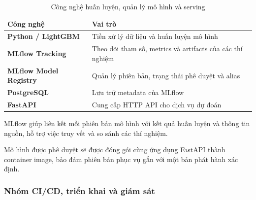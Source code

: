 \begin{table}[!htbp]\centering
\fontsize{12}{15}\selectfont{}
\setlength{\tabcolsep}{4pt}\setlength{\arrayrulewidth}{0.4pt}\renewcommand{\arraystretch}{1.2}
\setlength{\ReportTableWidth}{\dimexpr\linewidth-3\arrayrulewidth\relax}
\begin{tabular}{|L{\tabcolsep\relax}|L{\tabcolsep\relax}|}
\hline
\textbf{Công nghệ} & \textbf{Vai trò} \\
\hline
\textbf{Python / LightGBM} & Tiền xử lý dữ liệu và huấn luyện mô hình \\\hline
\textbf{MLflow Tracking} & Theo dõi tham số, metrics và artifacts của các thí nghiệm \\\hline
\textbf{MLflow Model Registry} & Quản lý phiên bản, trạng thái phê duyệt và alias  \\\hline
\textbf{PostgreSQL} & Lưu trữ metadata của MLflow \\\hline
\textbf{FastAPI} & Cung cấp HTTP API cho dịch vụ dự đoán \\\hline
\end{tabular}
\caption{Công nghệ huấn luyện, quản lý mô hình và serving}\label{tab:04}
\end{table}

MLflow giúp liên kết mỗi phiên bản mô hình với kết quả huấn luyện và thông tin nguồn, hỗ trợ việc truy vết và so sánh các thí nghiệm.


Mô hình được phê duyệt sẽ được đóng gói cùng ứng dụng FastAPI thành container image, bảo đảm phiên bản phục vụ gắn với một bản phát hành xác định.


\subsubsection{Nhóm CI/CD, triển khai và giám sát}


